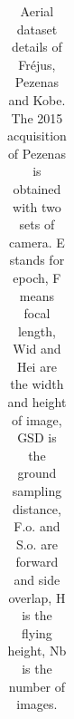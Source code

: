 \begin{table}[htbp]
\begin{tabular}{||l|c|c|c|c||c|c|c|c||c|c||}
        
    \end{tabular}
    \caption{Aerial dataset details of Fr{\'e}jus, Pezenas and Kobe. The 2015 acquisition of Pezenas is obtained with two sets of camera. E stands for epoch, F means focal length, Wid and Hei are the width and height of image, GSD is the ground sampling distance, F.o. and S.o. are forward and side overlap, H is the flying height, Nb is the number of images.}
    \label{Data details}
\end{table}


